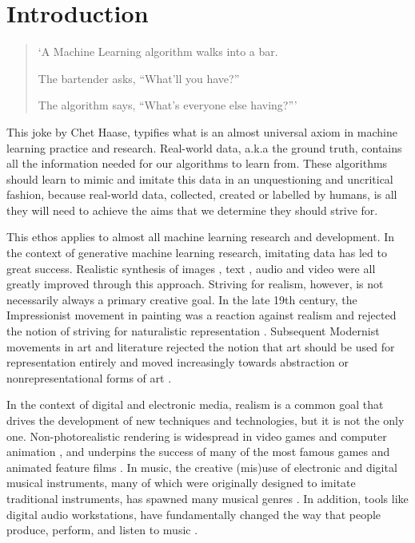 \chapter{Introduction}
\label{ch:intro}

\begin{quote}

`A Machine Learning algorithm walks into a bar.

The bartender asks, ``What'll you have?''

The algorithm says, ``What's everyone else having?''' \citep{haase2017bar} 

\end{quote}

This joke by Chet Haase, typifies what is an almost universal axiom in machine learning practice and research. 
Real-world data, a.k.a the ground truth, contains all the information needed for our algorithms to learn from. 
These algorithms should learn to mimic and imitate this data in an unquestioning and uncritical fashion, because real-world data, collected, created or labelled by humans, is all they will need to achieve the aims that we determine they should strive for.

This ethos applies to almost all machine learning research and development. In the context of generative machine learning research, imitating data has led to great success. 
Realistic synthesis of images \citep{karras2019style}, text \citep{radford2018improving}, audio \citep{oord2016wavenet} and video \citep{openai2024sora} were all greatly improved through this approach. 
Striving for realism, however, is not necessarily always a primary creative goal.
In the late 19th century, the Impressionist movement in painting was a reaction against realism and rejected the notion of striving for naturalistic representation \citep{venturi1941aesthetic}. 
Subsequent Modernist movements in art and literature rejected the notion that art should be used for representation entirely and moved increasingly towards abstraction or nonrepresentational forms of art \citep{lewis2007cambridge}.

In the context of digital and electronic media, realism is a common goal that drives the development of new techniques and technologies, but it is not the only one. 
Non-photorealistic rendering is widespread in video games and computer animation \citep{strothotte2002non}, and underpins the success of many of the most famous games and animated feature films \citep{kyprianidis2012state}. 
In music, the creative (mis)use of electronic and digital musical instruments, many of which were originally designed to imitate traditional instruments, has spawned many musical genres \citep{mcglynn2017happy}. 
In addition, tools like digital audio workstations, have fundamentally changed the way that people produce, perform, and listen to music \citep{ashbourn2021use}.

